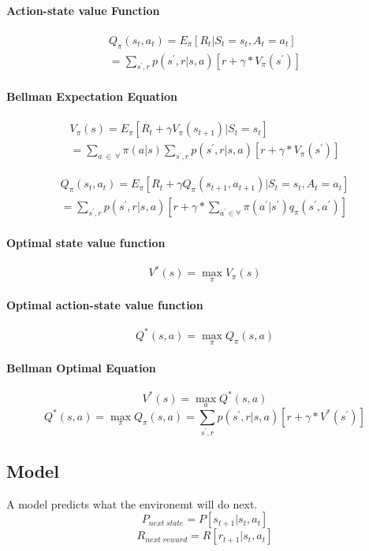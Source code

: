 \documentclass{article}
\begin{document}
\begin{CJK*}{UTF8}{gbsn}
\paragraph{Action-state value Function}

\begin{align*}
Q_{\pi}(s_{t},a_{t})=E_{\pi}[R_{t}|S_{t}=s_{t},A_{t}=a_{t}] \\
= \sum_{s^{'},r}p(s^{'},r|s,a)[r+\gamma * V_{\pi}(s^{'})]
\end{align*}


\paragraph{Bellman Expectation Equation}
\begin{align*}
V_{\pi}(s)=E_{\pi} [R_{t}+\gamma V_{\pi}(s_{t+1})|S_{t}=s_{t}] \\
= \sum_{a \ \in \ \forall} \pi(a|s) \sum_{s^{'},r}p(s^{'},r|s,a)[r+\gamma * V_{\pi}(s^{'})]
\end{align*}


\begin{align*}
Q_{\pi}(s_{t},a_{t})=E_{\pi}[R_{t}+\gamma Q_{\pi}(s_{t+1},a_{t+1})|S_{t}=s_{t},A_{t}=a_{t}]  \\
= \sum_{s^{'},r} p(s^{'},r|s,a)[r+\gamma * \sum_{a^{'} \in \forall} \pi(a^{'}|s^{'})q_{\pi}(s^{'},a^{'})]
\end{align*}


\paragraph{Optimal state value function}
$$V^{*}(s)=\max \limits_{\pi} V_{\pi}(s) $$

\paragraph{Optimal action-state value function}
$$Q^{*}(s,a)=\max \limits_{\pi} Q_{\pi}(s,a)$$

\paragraph{Bellman Optimal Equation}
$$V^{*}(s)=\max \limits_{a} Q^{*}(s,a) $$
$$Q^{*}(s,a)=\max \limits_{\pi} Q_{\pi}(s,a) = \sum_{s^{'},r}p(s^{'},r|s,a)[r+\gamma * V^{*}(s^{'})]$$

\subsection{Model}
A model predicts what the environemt will do next.
$$P_{next \; state}= P\left[s_{t+1}|s_{t},a_{t}\right]$$
$$R_{next \; reward}=R\left[r_{t+1}|s_{t},a_{t} \right]$$




\end{CJK*}
\end{document}
